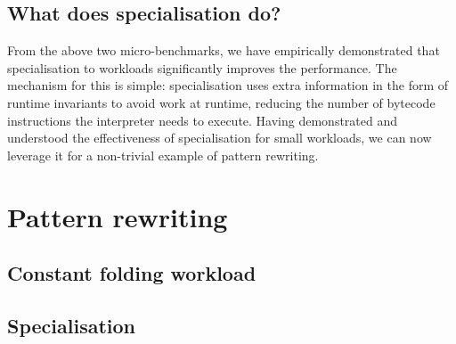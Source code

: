 \subsection{What does specialisation do?}
\label{ssec:specialising-what-do}

From the above two micro-benchmarks, we have empirically demonstrated that specialisation to workloads significantly improves the performance.
The mechanism for this is simple: specialisation uses extra information in the form of runtime invariants to avoid work at runtime, reducing the number of bytecode instructions the interpreter needs to execute.
Having demonstrated and understood the effectiveness of specialisation for small workloads, we can now leverage it for a non-trivial example of pattern rewriting.


\section{Pattern rewriting}
\label{sec:specialising-pattern-rewriting}


\subsection{Constant folding workload}
\label{sec:specialising-pattern-rewriting-workload}




\subsection{Specialisation}
\label{sec:specialising-pattern-rewriting-specialisation}



